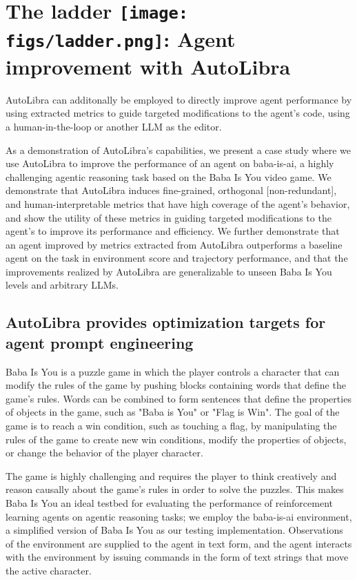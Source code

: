 \section{The ladder \protect\texttt{[image: figs/ladder.png]}: Agent improvement with AutoLibra}

AutoLibra can additonally be employed to directly improve agent performance by using extracted metrics to guide targeted modifications to the agent's code, using a human-in-the-loop or another LLM as the editor.

As a demonstration of AutoLibra's capabilities, we present a case study where we use AutoLibra to improve the performance of an agent on baba-is-ai, a highly challenging agentic reasoning task based on the Baba Is You video game. We demonstrate that AutoLibra induces fine-grained, orthogonal [non-redundant], and human-interpretable metrics that have high coverage of the agent's behavior, and show the utility of these metrics in guiding targeted modifications to the agent's to improve its performance and efficiency. We further demonstrate that an agent improved by metrics extracted from AutoLibra outperforms a baseline agent on the task in environment score and trajectory performance, and that the improvements realized by AutoLibra are generalizable to unseen Baba Is You levels and arbitrary LLMs.

\subsection{AutoLibra provides optimization targets for agent prompt engineering}
\label{sec:baba-is-ai}
Baba Is You is a puzzle game in which the player controls a character that can modify the rules of the game by pushing blocks containing words that define the game's rules. Words can be combined to form sentences that define the properties of objects in the game, such as "Baba is You" or "Flag is Win". The goal of the game is to reach a win condition, such as touching a flag, by manipulating the rules of the game to create new win conditions, modify the properties of objects, or change the behavior of the player character.

The game is highly challenging and requires the player to think creatively and reason causally about the game's rules in order to solve the puzzles. This makes Baba Is You an ideal testbed for evaluating the performance of reinforcement learning agents on agentic reasoning tasks; we employ the baba-is-ai environment, a simplified version of Baba Is You \cite{cloos2024babaaibreakrules, paglieri2024balrog} as our testing implementation. Observations of the environment are supplied to the agent in text form, and the agent interacts with the environment by issuing commands in the form of text strings that move the active character.

